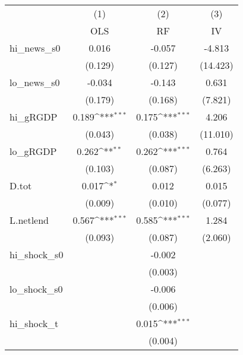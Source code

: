 {
\def\sym#1{\ifmmode^{#1}\else\(^{#1}\)\fi}
\begin{tabular}{l*{3}{c}}
\toprule
            &\multicolumn{1}{c}{(1)}&\multicolumn{1}{c}{(2)}&\multicolumn{1}{c}{(3)}\\
            &\multicolumn{1}{c}{OLS}&\multicolumn{1}{c}{RF}&\multicolumn{1}{c}{IV}\\
\midrule
hi\_news\_s0  &       0.016         &      -0.057         &      -4.813         \\
            &     (0.129)         &     (0.127)         &    (14.423)         \\
\addlinespace
lo\_news\_s0  &      -0.034         &      -0.143         &       0.631         \\
            &     (0.179)         &     (0.168)         &     (7.821)         \\
\addlinespace
hi\_gRGDP    &       0.189\sym{***}&       0.175\sym{***}&       4.206         \\
            &     (0.043)         &     (0.038)         &    (11.010)         \\
\addlinespace
lo\_gRGDP    &       0.262\sym{**} &       0.262\sym{***}&       0.764         \\
            &     (0.103)         &     (0.087)         &     (6.263)         \\
\addlinespace
D.tot       &       0.017\sym{*}  &       0.012         &       0.015         \\
            &     (0.009)         &     (0.010)         &     (0.077)         \\
\addlinespace
L.netlend   &       0.567\sym{***}&       0.585\sym{***}&       1.284         \\
            &     (0.093)         &     (0.087)         &     (2.060)         \\
\addlinespace
hi\_shock\_s0 &                     &      -0.002         &                     \\
            &                     &     (0.003)         &                     \\
\addlinespace
lo\_shock\_s0 &                     &      -0.006         &                     \\
            &                     &     (0.006)         &                     \\
\addlinespace
hi\_shock\_t  &                     &       0.015\sym{***}&                     \\
            &                     &     (0.004)         &                     \\

\end{tabular}}
